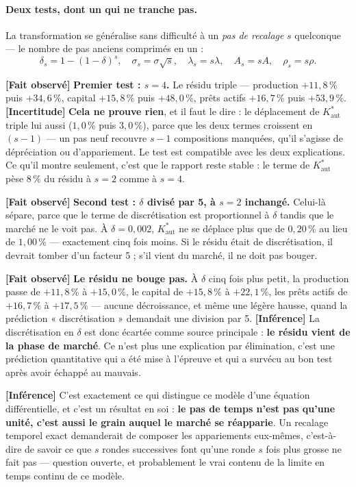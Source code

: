 \documentclass[11pt,a4paper]{article}
\newcommand{\Kaut}{K^{*}_{\mathrm{aut}}}
\newcommand{\fait}{\textbf{[Fait observé]}}
\newcommand{\inference}{\textbf{[Inférence]}}
\newcommand{\incertitude}{\textbf{[Incertitude]}}
\begin{document}
\paragraph{Deux tests, dont un qui ne tranche pas.} La transformation se
généralise sans difficulté à un \emph{pas de recalage} $s$ quelconque --- le
nombre de pas anciens comprimés en un :
\[
\delta_s = 1 - (1-\delta)^s, \quad \sigma_s = \sigma\sqrt{s}, \quad
\lambda_s = s\lambda, \quad A_s = sA, \quad \rho_s = s\rho .
\]

\fait{} \textbf{Premier test : $s = 4$.} Le résidu triple --- production
$+11{,}8\,\%$ puis $+34{,}6\,\%$, capital $+15{,}8\,\%$ puis $+48{,}0\,\%$,
prêts actifs $+16{,}7\,\%$ puis $+53{,}9\,\%$. \incertitude{} \textbf{Cela ne
prouve rien}, et il faut le dire : le déplacement de $\Kaut$ triple lui aussi
($1{,}0\,\%$ puis $3{,}0\,\%$), parce que les deux termes croissent en
$(s-1)$ --- un pas neuf recouvre $s-1$ compositions manquées, qu'il s'agisse
de dépréciation ou d'appariement. Le test est compatible avec les deux
explications. Ce qu'il montre seulement, c'est que le rapport reste stable :
le terme de $\Kaut$ pèse $8\,\%$ du résidu à $s = 2$ comme à $s = 4$.

\fait{} \textbf{Second test : $\delta$ divisé par 5, à $s = 2$ inchangé.}
Celui-là sépare, parce que le terme de discrétisation est proportionnel à
$\delta$ tandis que le marché ne le voit pas. À $\delta = 0{,}002$, $\Kaut$
ne se déplace plus que de $0{,}20\,\%$ au lieu de $1{,}00\,\%$ --- exactement
cinq fois moins. Si le résidu était de discrétisation, il devrait tomber d'un
facteur 5 ; s'il vient du marché, il ne doit pas bouger.



\fait{} \textbf{Le résidu ne bouge pas.} À $\delta$ cinq fois plus petit, la
production passe de $+11{,}8\,\%$ à $+15{,}0\,\%$, le capital de
$+15{,}8\,\%$ à $+22{,}1\,\%$, les prêts actifs de $+16{,}7\,\%$ à
$+17{,}5\,\%$ --- aucune décroissance, et même une légère hausse, quand la
prédiction « discrétisation » demandait une division par 5.
\inference{} La discrétisation en $\delta$ est donc écartée comme source
principale : \textbf{le résidu vient de la phase de marché}. Ce n'est plus
une explication par élimination, c'est une prédiction quantitative qui a été
mise à l'épreuve et qui a survécu au bon test après avoir échappé au mauvais.

\inference{} C'est exactement ce qui distingue ce modèle d'une équation
différentielle, et c'est un résultat en soi : \textbf{le pas de temps n'est
pas qu'une unité, c'est aussi le grain auquel le marché se réapparie}. Un
recalage temporel exact demanderait de composer les appariements eux-mêmes,
c'est-à-dire de savoir ce que $s$ rondes successives font qu'une ronde $s$
fois plus grosse ne fait pas --- question ouverte, et probablement le vrai
contenu de la limite en temps continu de ce modèle.
\end{document}
